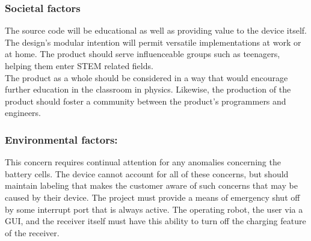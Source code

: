 \documentclass[12pt]{article}
\begin{document}
\subsubsection{Societal factors}
The source code will be educational as well as providing value to the device itself.  The design's modular intention will permit versatile implementations at work or at home.  The product should serve influenceable groups such as teenagers, helping them enter STEM related fields.\\
The product as a whole should be considered in a way that would encourage further education in the classroom in physics.  Likewise, the production of the product should foster a community between the product's programmers and engineers.

\subsubsection{Environmental factors:}
This concern requires continual attention for any anomalies concerning the battery cells.  The device cannot account for all of these concerns, but should maintain labeling that makes the customer aware of such concerns that may be caused by their device.  The project must provide a means of emergency shut off by some interrupt port that is always active.  The operating robot, the user via a GUI, and the receiver itself must have this ability to turn off the charging feature of the receiver.
\end{document}
